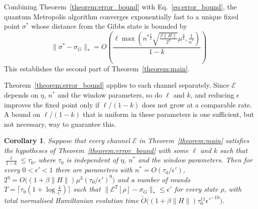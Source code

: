 \documentclass[aps,floatfix,10pt,amssymb,amsfont,amsmath,superscriptaddress,float,nofootinbib,longbibliography,nobalancelastpage,twocolumn]{revtex4-2}
\newtheorem{corollary}{Corollary}
\begin{document}
Combining Theorem~\ref{theorem:error_bound} with Eq.~\eqref{eq:error_bound}, the quantum Metropolis algorithm converges exponentially fast to a unique fixed point $\sigma^*$ whose distance from the Gibbs state is bounded by
\begin{equation}
    \|\sigma^*-\sigma_G\|_* =
    O\left(\frac{\ell\max\left( n^{*\frac{7}{2}}\sqrt{\frac{\beta\|H\| }{2^{\eta}}}\mu^{\frac{3}{2}},\frac{1}{n^*}\right)}{1-k}\right)
\end{equation}
This establishes the second part of Theorem~\ref{theorem:main}.
 
Theorem~\ref{theorem:error_bound} applies to each channel separately. Since $\mathcal{E}$ depends on $\eta$, $n^*$ and the window parameters, so do $\ell$ and $k$, and reducing $\epsilon$ improves the fixed point only if $\ell/(1-k)$ does not grow at a comparable rate. A bound on $\ell/(1-k)$ that is uniform in these parameters is one sufficient, but not necessary, way to guarantee this.
\begin{corollary}
\label{corollary:polycost}
Suppose that every channel $\mathcal{E}$ in Theorem~\ref{theorem:main} satisfies the hypotheses of Theorem~\ref{theorem:error_bound} with some $\ell$ and $k$ such that $\frac{\ell}{1-k}\leq\tau_0$, where $\tau_0$ is independent of $\eta$, $n^*$ and the window parameters. Then for every $0<\epsilon'<1$ there are parameters with $n^*=O(\tau_0/\epsilon')$, $2^{\eta}=O\big((1+\beta\|H\|)\mu^3(\tau_0/\epsilon')^{9}\big)$ and a number of rounds $T=\lceil\tau_0(1+\log\frac{4}{\epsilon'})\rceil$ such that $\|\mathcal{E}^T[\rho]-\sigma_G\|_*\leq\epsilon'$ for every state $\rho$, with total normalised Hamiltonian evolution time $\tilde O\big((1+\beta\|H\|)\tau_0^{11}\epsilon'^{-10}\big)$.
\end{corollary}
\end{document}

